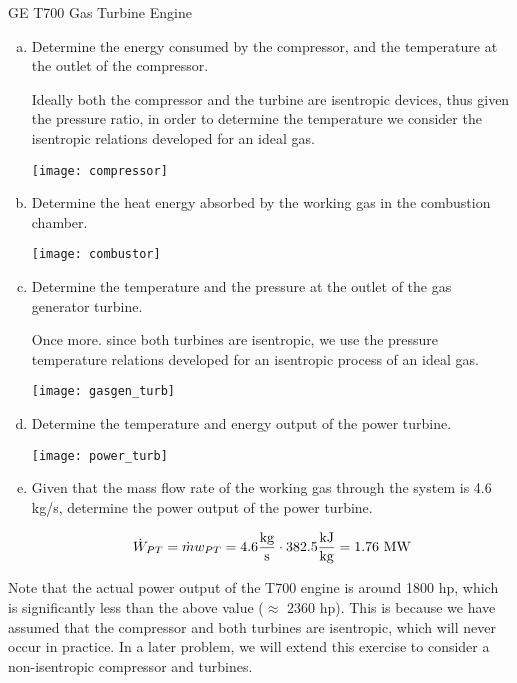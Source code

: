 \begin{example}[label=ex:T700]{GE T700 Gas Turbine Engine}
\begin{enumerate}[a)]
   
\item Determine the energy consumed by the compressor, and the temperature at the outlet of the compressor.

  Ideally both the compressor and the turbine are isentropic devices, thus given the pressure ratio, in order to determine the temperature we consider the isentropic relations developed for an ideal gas.

  
  \begin{center}
    \texttt{[image: compressor]}
  \end{center}
  
\item Determine the heat energy absorbed by the working gas in the combustion chamber.
  
  \begin{center}
    \texttt{[image: combustor]}
  \end{center}
  
\item Determine the temperature and the pressure at the outlet of the gas generator turbine.

  Once more. since both turbines are isentropic, we use the pressure temperature relations developed for an isentropic process of an ideal gas.

  \begin{center}
    \texttt{[image: gasgen\_turb]}
  \end{center}
    
\item Determine the temperature and energy output of the power turbine.
  
  \begin{center}
    \texttt{[image: power\_turb]}
  \end{center}
\item Given that the mass flow rate of the working gas through the system is 4.6 kg/s, determine the power output of the power turbine.

  \begin{equation*}
    \dot{W}_{PT} = \dot{m} w_{PT} = 4.6 \frac{\rm kg}{\rm s} \cdot 382.5\frac{\rm kJ}{\rm kg} = 1.76\ {\rm MW}
  \end{equation*}
  \end{enumerate}

  Note that the actual power output of the T700 engine is around 1800 hp, which is significantly less than the above value ($\approx$ 2360 hp). This is because we have assumed that the compressor and both turbines are isentropic, which will never occur in practice. In a later problem, we will extend this exercise to consider a non-isentropic compressor and turbines.
\end{example}




